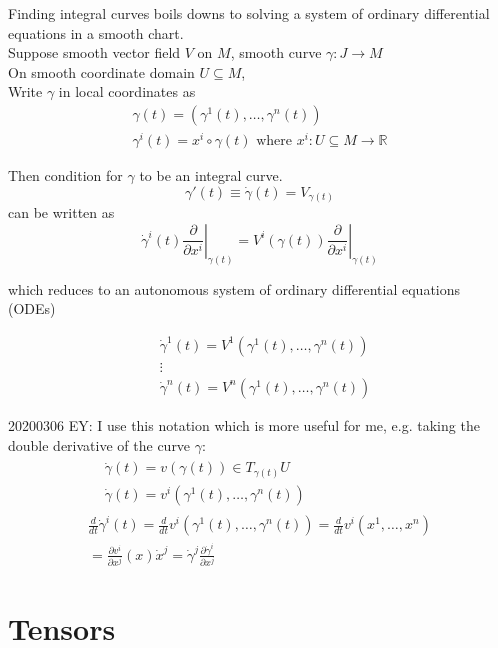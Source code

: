 \documentclass[10pt]{amsart}
\begin{document}
\begin{multicols*}{2}
Finding integral curves boils downs to solving a system of ordinary differential equations in a smooth chart. \\
Suppose smooth vector field $V$ on $M$, smooth curve $\gamma : J \to M$ \\
On smooth coordinate domain $U \subseteq M$, \\
Write $\gamma$ in local coordinates as 
\[
\begin{gathered}
	\gamma(t) = (\gamma^{1}(t), \dots , \gamma^{n}(t)) \\
	\gamma^i(t) = x^i \circ \gamma(t) \text{ where } x^i : U \subseteq M \to \mathbb{R} 
\end{gathered}
\]

Then condition for $\gamma$ to be an integral curve.
\[
\gamma'(t) \equiv \dot{\gamma}(t) = V_{\gamma(t)}
\]
can be written as 
\[
\dot{\gamma}^i(t) \left. \frac{\partial}{\partial x^i} \right|_{\gamma(t)} = V^i(\gamma(t)) \left. \frac{\partial }{ \partial x^i } \right|_{\gamma(t)}
\]

which reduces to an autonomous system of ordinary differential equations (ODEs)

\begin{equation}
\begin{aligned} 
& \dot{\gamma}^1(t) = V^1(\gamma^1(t), \dots, \gamma^n(t)) \\ 
& \vdots \\ 
& \dot{\gamma}^n(t) = V^n(\gamma^1(t), \dots , \gamma^n(t))
\end{aligned} 
\end{equation}

20200306 EY: I use this notation which is more useful for me, e.g. taking the double derivative of the curve $\gamma$: 
\[
\begin{gathered} 
\begin{aligned} 
& \dot{\gamma}(t) = v(\gamma(t)) \in T_{\gamma(t)}U \\ 
& \dot{\gamma}(t) = v^i(\gamma^1(t), \dots, \gamma^n(t))
\end{aligned} \\ 
\frac{d}{dt} \dot{\gamma}^i(t) = \frac{d}{dt} v^i(\gamma^1(t), \dots , \gamma^n(t)) = \frac{d}{dt} v^i(x^1 , \dots , x^n) \\
= \frac{\partial v^i}{\partial x^j}(x) \dot{x}^j = \dot{\gamma}^j \frac{\partial \dot{\gamma}^i}{\partial x^j}
\end{gathered} 
\]


\section{Tensors}


\end{multicols*}
\end{document}
